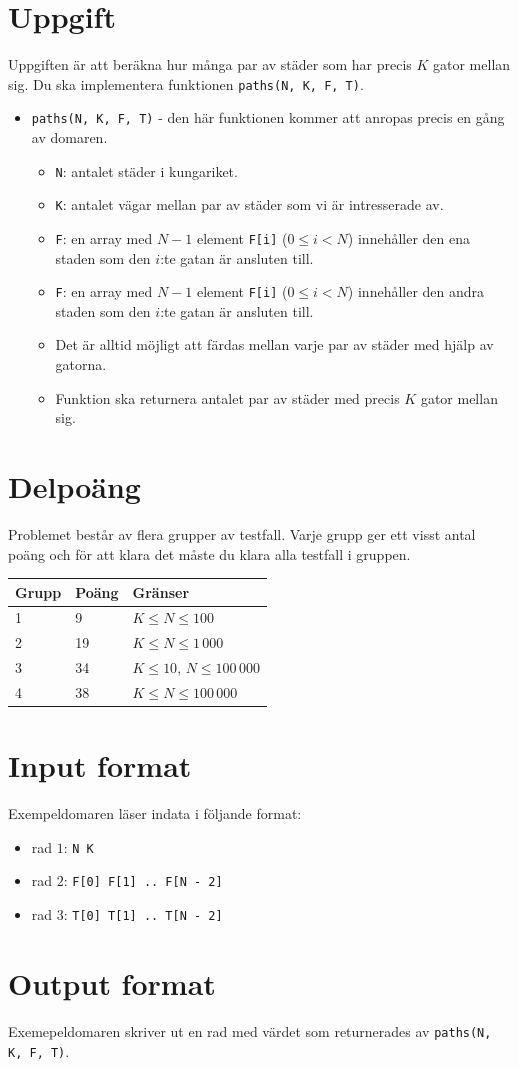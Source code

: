 \section*{Uppgift}
Uppgiften är att beräkna hur många par av städer som har precis $K$ gator mellan sig. Du ska implementera funktionen \texttt{paths(N, K, F, T)}.
\begin{itemize}
  \item \texttt{paths(N, K, F, T)} - den här funktionen kommer att anropas precis en gång av domaren.
  \begin{itemize}
    \item \texttt{N}: antalet städer i kungariket.
    \item \texttt{K}: antalet vägar mellan par av städer som vi är intresserade av.
    \item \texttt{F}: en array med $N-1$ element \texttt{F[i]} ($0 \le i < N$) innehåller den ena staden som den $i$:te gatan är ansluten till.
    \item \texttt{F}: en array med $N-1$ element \texttt{F[i]} ($0 \le i < N$) innehåller den andra staden som den $i$:te gatan är ansluten till.
    \item Det är alltid möjligt att färdas mellan varje par av städer med hjälp av gatorna.
    \item Funktion ska returnera antalet par av städer med precis $K$ gator mellan sig.
  \end{itemize}
\end{itemize}

\section*{Delpoäng}
Problemet består av flera grupper av testfall. Varje grupp ger ett visst antal poäng och för att klara det måste du klara alla testfall i gruppen.

\begin{tabular}{|l|l|l|}
  \hline
  \textbf{Grupp} & \textbf{Poäng} & \textbf{Gränser} \\ \hline
  1 & 9 & $K \le N \le 100$ \\ \hline
  2 & 19 & $K \le N \le 1\,000$ \\ \hline
  3 & 34 & $K \le 10$, $N \le 100\,000$ \\ \hline
  4 & 38 & $K \le N \le 100\,000$ \\ \hline
\end{tabular}

\section*{Input format}
Exempeldomaren läser indata i följande format:

\begin{itemize}
  \item rad $1$: \texttt{N K}
  \item rad $2$: \texttt{F[0] F[1] .. F[N - 2]}
  \item rad $3$: \texttt{T[0] T[1] .. T[N - 2]}
\end{itemize}

\section*{Output format}
Exemepeldomaren skriver ut en rad med värdet som returnerades av \texttt{paths(N, K, F, T)}.
